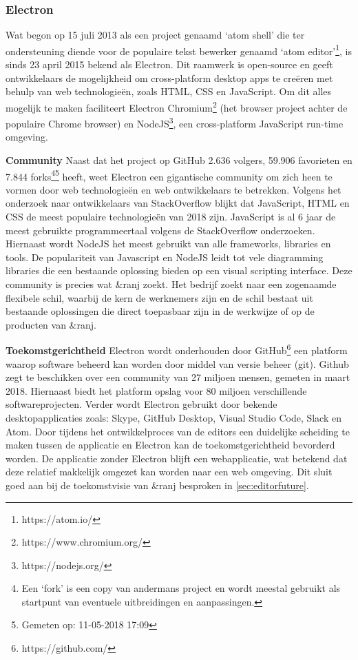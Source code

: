 \subsubsection{Electron}
Wat begon op 15 juli 2013\cite{StartOfAtomShell} als een project genaamd ‘atom shell’ die ter ondersteuning diende voor de populaire tekst bewerker genaamd ‘atom editor’\footnote{https://atom.io/}, is sinds 23 april 2015 bekend als Electron\cite{AtomShellIsNowElectron}. Dit raamwerk is open-source en geeft ontwikkelaars de mogelijkheid om cross-platform desktop apps te creëren met behulp van web technologieën, zoals HTML, CSS en JavaScript. Om dit alles mogelijk te maken faciliteert Electron Chromium\footnote{https://www.chromium.org/} (het browser project achter de populaire Chrome browser) en NodeJS\footnote{https://nodejs.org/}, een cross-platform JavaScript run-time omgeving. 

\textbf{Community}
Naast dat het project op GitHub 2.636 volgers, 59.906 favorieten en 7.844 forks\footnote{Een ‘fork’ is een copy van andermans project en wordt meestal gebruikt als startpunt van eventuele uitbreidingen en aanpassingen.}\footnote{Gemeten op: 11-05-2018 17:09} \cite{GithubElectron} heeft, weet Electron een gigantische community om zich heen te vormen door web technologieën en web ontwikkelaars te betrekken. Volgens het onderzoek naar ontwikkelaars van StackOverflow blijkt dat JavaScript, HTML en CSS de meest populaire technologieën van 2018 zijn\cite{StackOverflowAnnualSurvey2018}. JavaScript is al 6 jaar de meest gebruikte programmeertaal volgens de StackOverflow onderzoeken. Hiernaast wordt NodeJS het meest gebruikt van alle frameworks, libraries en tools\cite{StackOverflowAnnualSurvey2018}.
De populariteit van Javascript en NodeJS leidt tot vele diagramming libraries die een bestaande oplossing bieden op een visual scripting interface.
Deze community is precies wat \&ranj zoekt. Het bedrijf zoekt naar een zogenaamde flexibele schil, waarbij de kern de werknemers zijn en de schil bestaat uit bestaande oplossingen die direct toepasbaar zijn in de werkwijze of op de producten van \&ranj.

\textbf{Toekomstgerichtheid}
Electron wordt onderhouden door GitHub\footnote{https://github.com/} een platform waarop software beheerd kan worden door middel van versie beheer (git). Github zegt te beschikken over een community van 27 miljoen mensen, gemeten in maart 2018\cite{GithubAbout}. Hiernaast biedt het platform opslag voor 80 miljoen verschillende softwareprojecten.
Verder wordt Electron gebruikt door bekende desktopapplicaties zoals: Skype, GitHub Desktop, Visual Studio Code, Slack en Atom\cite{ElectronJS}.
Door tijdens het ontwikkelproces van de editors een duidelijke scheiding te maken tussen de applicatie en Electron kan de toekomstgerichtheid bevorderd worden. De applicatie zonder Electron blijft een webapplicatie, wat betekend dat deze relatief makkelijk omgezet kan worden naar een web omgeving. Dit sluit goed aan bij de toekomstvisie van \&ranj besproken in \autoref{sec:editorfuture}.

